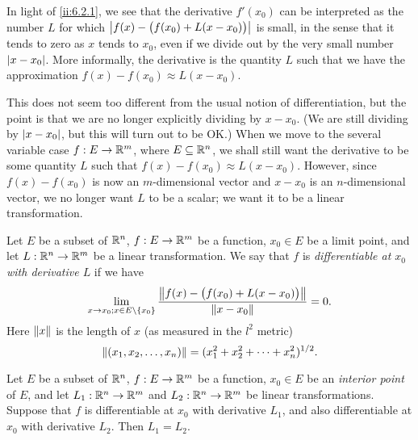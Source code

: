 \begin{note}
  In light of \cref{ii:6.2.1}, we see that the derivative \(f'(x_0)\) can be interpreted as the number \(L\) for which \(\abs{f(x) - \big(f(x_0) + L(x - x_0)\big)}\) is small, in the sense that it tends to zero as \(x\) tends to \(x_0\), even if we divide out by the very small number \(\abs{x - x_0}\).
  More informally, the derivative is the quantity \(L\) such that we have the approximation \(f(x) - f(x_0) \approx L(x - x_0)\).

  This does not seem too different from the usual notion of differentiation, but the point is that we are no longer explicitly dividing by \(x - x_0\).
  (We are still dividing by \(\abs{x - x_0}\), but this will turn out to be OK.)
  When we move to the several variable case \(f : E \to \R^m\), where \(E \subseteq \R^n\), we shall still want the derivative to be some quantity \(L\) such that \(f(x) - f(x_0) \approx L(x - x_0)\).
  However, since \(f(x) - f(x_0)\) is now an \(m\)-dimensional vector and \(x - x_0\) is an \(n\)-dimensional vector, we no longer want \(L\) to be a scalar;
  we want it to be a linear transformation.
\end{note}

\begin{defn}[Differentiability]\label{ii:6.2.2}
  Let \(E\) be a subset of \(\R^n\), \(f : E \to \R^m\) be a function, \(x_0 \in E\) be a limit point, and let \(L : \R^n \to \R^m\) be a linear transformation.
  We say that \(f\) is \emph{differentiable at \(x_0\) with derivative \(L\)} if we have
  \[
    \lim_{x \to x_0 ; x \in E \setminus \set{x_0}} \dfrac{\norm*{f(x) - \big(f(x_0) + L(x - x_0)\big)}}{\norm*{x - x_0}} = 0.
  \]
  Here \(\norm*{x}\) is the length of \(x\) (as measured in the \(l^2\) metric)
  \[
    \norm*{(x_1, x_2, \dots, x_n)} = (x_1^2 + x_2^2 + \dots + x_n^2)^{1 / 2}.
  \]
\end{defn}

\setcounter{thm}{3}
\begin{lem}\label{ii:6.2.4}
  Let \(E\) be a subset of \(\R^n\), \(f : E \to \R^m\) be a function, \(x_0 \in E\) be an \emph{interior point} of \(E\), and let \(L_1 : \R^n \to \R^m\) and \(L_2 : \R^n \to \R^m\) be linear transformations.
  Suppose that \(f\) is differentiable at \(x_0\) with derivative \(L_1\), and also differentiable at \(x_0\) with derivative \(L_2\).
  Then \(L_1 = L_2\).
\end{lem}

